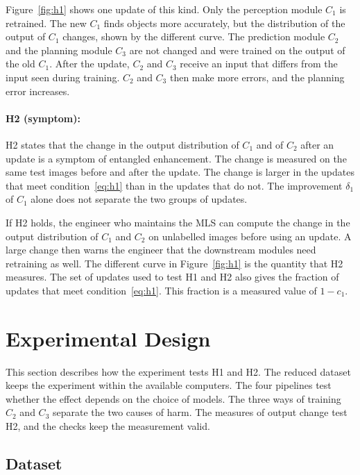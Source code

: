 \documentclass[11pt,a4paper]{article}
\begin{document}
Figure~\ref{fig:h1} shows one update of this kind. Only the perception
module $C_1$ is retrained. The new $C_1$ finds objects more accurately, but
the distribution of the output of $C_1$ changes, shown by the different
curve. The prediction module $C_2$ and the planning module $C_3$ are not
changed and were trained on the output of the old $C_1$. After the update,
$C_2$ and $C_3$ receive an input that differs from the input seen during
training. $C_2$ and $C_3$ then make more errors, and the planning error
increases.

\paragraph{H2 (symptom):} H2 states that the change in the output distribution of $C_1$ and
of $C_2$ after an update is a symptom of entangled enhancement. The change is measured on the
same test images before and after the update. The change is larger in the
updates that meet condition~\eqref{eq:h1} than in the updates that do not.
The improvement $\delta_1$ of $C_1$ alone does not separate the two groups
of updates.

If H2 holds, the engineer who maintains the MLS can compute the change in
the output distribution of $C_1$ and $C_2$ on unlabelled images before
using an update. A large change then warns the engineer that the
downstream modules need retraining as well. The different curve in
Figure~\ref{fig:h1} is the quantity that H2 measures. The set of updates
used to test H1 and H2 also gives the fraction of updates that meet
condition~\eqref{eq:h1}. This fraction is a measured value of $1 - c_1$.

\section{Experimental Design}
\label{sec:design}

This section describes how the experiment tests H1 and H2. The reduced
dataset keeps the experiment within the available computers. The four
pipelines test whether the effect depends on the choice of models. The
three ways of training $C_2$ and $C_3$ separate the two causes of harm.
The measures of output change test H2, and the checks keep the
measurement valid.

\subsection{Dataset}
\label{sec:data}
\end{document}
